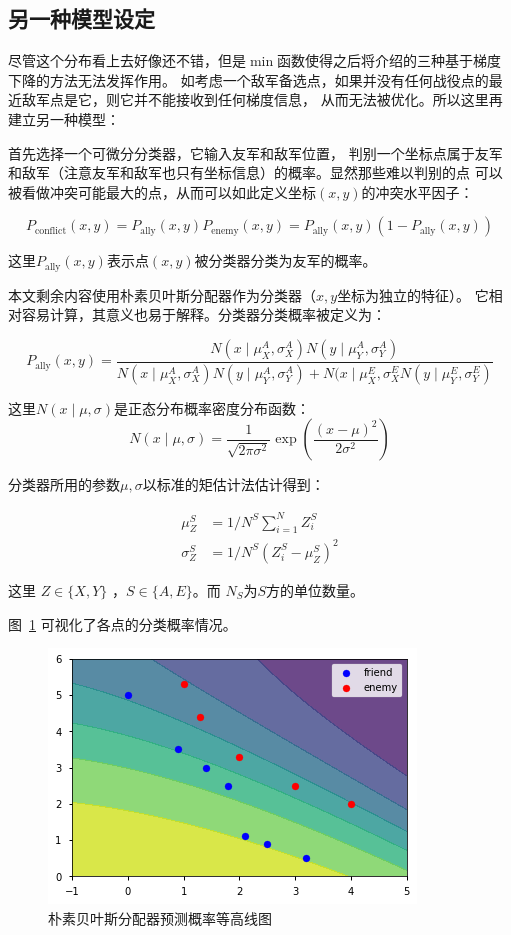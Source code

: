 \documentclass{sicnuthesis}
\begin{document}
\subsection{另一种模型设定}


尽管这个分布看上去好像还不错，但是$\min$函数使得之后将介绍的三种基于梯度下降的方法无法发挥作用。
如考虑一个敌军备选点，如果并没有任何战役点的最近敌军点是它，则它并不能接收到任何梯度信息，
从而无法被优化。所以这里再建立另一种模型：

首先选择一个可微分分类器，它输入友军和敌军位置，
判别一个坐标点属于友军和敌军（注意友军和敌军也只有坐标信息）的概率。显然那些难以判别的点
可以被看做冲突可能最大的点，从而可以如此定义坐标$(x,y)$的冲突水平因子：

$$
P_{\text{conflict}}(x,y) = P_\text{ally}(x,y) P_\text{enemy}(x,y) = P_\text{ally}(x,y)(1-P_\text{ally}(x,y))
$$


这里$P_\text{ally}(x,y)$表示点$(x,y)$被分类器分类为友军的概率。

本文剩余内容使用朴素贝叶斯分配器作为分类器（$x,y$坐标为独立的特征）。
它相对容易计算，其意义也易于解释。分类器分类概率被定义为：

$$
P_\text{ally}(x,y) = \frac{
N(x\mid \mu^A_X ,\sigma^A_X) N(y \mid \mu^A_Y, \sigma^A_Y)
}{
N(x \mid \mu^A_X , \sigma^A_X) N(y \mid \mu^A_Y , \sigma^A_Y) + 
N(x \mid \mu^E_X , \sigma^E_X N(y \mid \mu^E_Y , \sigma^E_Y)
}
$$


这里$N(x \mid \mu,\sigma)$是正态分布概率密度分布函数：
$$
N(x \mid \mu,\sigma) = \frac{1}{\sqrt{2\pi \sigma^2}} \exp\left(\frac{(x-\mu)^2}{2\sigma^2}\right)
$$


分类器所用的参数$\mu,\sigma$以标准的矩估计法估计得到：

\begin{align*}
\mu_Z^S    &= 1/N^S \sum_{i=1}^N Z_i^S \\
\sigma_Z^S &= 1/N^S (Z_i^S - \mu_Z^S)^2
\end{align*}


这里 $Z \in \{ X,Y \}$ ，$S \in \{ A,E \}$。而 $N_S$为$S$方的单位数量。

图~\ref{fig:naivebayes} 可视化了各点的分类概率情况。

\begin{figure}[htb]
\includegraphics[width=0.6\linewidth]{naivebayes.png}
\caption{朴素贝叶斯分配器预测概率等高线图}
\label{fig:naivebayes}
\end{figure}
\end{document}
